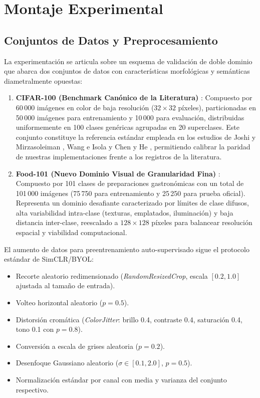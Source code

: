 \section{Montaje Experimental}
\label{sec:setup}

\subsection{Conjuntos de Datos y Preprocesamiento}
La experimentación se articula sobre un esquema de validación de doble dominio que abarca dos conjuntos de datos con características morfológicas y semánticas diametralmente opuestas:
\begin{enumerate}
    \item \textbf{CIFAR-100 (Benchmark Canónico de la Literatura)} \cite{krizhevsky2009cifar}: Compuesto por 60\,000 imágenes en color de baja resolución ($32 \times 32$ píxeles), particionadas en 50\,000 imágenes para entrenamiento y 10\,000 para evaluación, distribuidas uniformemente en 100 clases genéricas agrupadas en 20 superclases. Este conjunto constituye la referencia estándar empleada en los estudios de Joshi y Mirzasoleiman \cite{joshi2023sas}, Wang e Isola \cite{wang2020alignuniform} y Chen y He \cite{chen2021simsiam}, permitiendo calibrar la paridad de nuestras implementaciones frente a los registros de la literatura.
    \item \textbf{Food-101 (Nuevo Dominio Visual de Granularidad Fina)} \cite{bossard2014food101}: Compuesto por 101 clases de preparaciones gastronómicas con un total de 101\,000 imágenes (75\,750 para entrenamiento y 25\,250 para prueba oficial). Representa un dominio desafiante caracterizado por límites de clase difusos, alta variabilidad intra-clase (texturas, emplatados, iluminación) y baja distancia inter-clase, reescalado a $128 \times 128$ píxeles para balancear resolución espacial y viabilidad computacional.
\end{enumerate}

El aumento de datos para preentrenamiento auto-supervisado sigue el protocolo estándar de SimCLR/BYOL:
\begin{itemize}
    \item Recorte aleatorio redimensionado (\textit{RandomResizedCrop}, escala $[0.2, 1.0]$ ajustada al tamaño de entrada).
    \item Volteo horizontal aleatorio ($p = 0.5$).
    \item Distorsión cromática (\textit{ColorJitter}: brillo 0.4, contraste 0.4, saturación 0.4, tono 0.1 con $p = 0.8$).
    \item Conversión a escala de grises aleatoria ($p = 0.2$).
    \item Desenfoque Gaussiano aleatorio ($\sigma \in [0.1, 2.0]$, $p = 0.5$).
    \item Normalización estándar por canal con media y varianza del conjunto respectivo.
\end{itemize}

